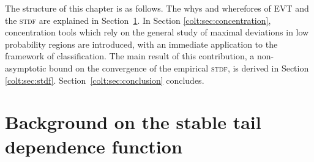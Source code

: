 The structure of this chapter is as follows. The whys and wherefores of
 \textsc{EVT} and the \textsc{stdf} are explained in
 Section~\ref{colt:sec:background}. In Section \ref{colt:sec:concentration},
 concentration tools which rely on the general study of maximal
 deviations in low probability regions are introduced, with an
 immediate application to the framework of classification. The main result of this contribution,  a
 non-asymptotic bound on the convergence of the empirical
 \textsc{stdf}, is derived in Section \ref{colt:sec:stdf}. Section~\ref{colt:sec:conclusion} concludes.

\section{Background on the stable tail dependence function}
\label{colt:sec:background}
